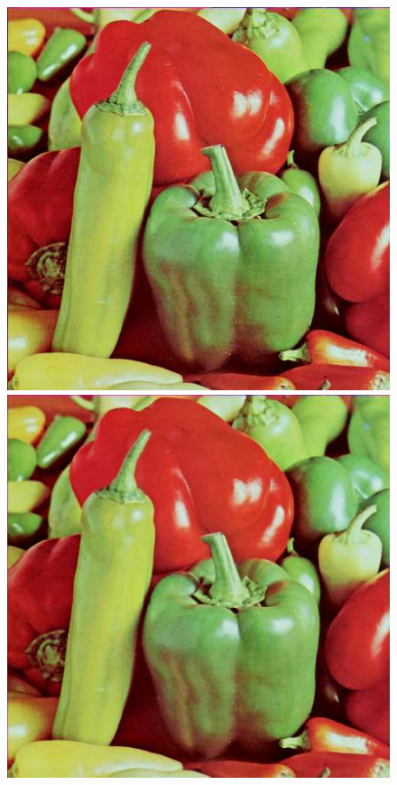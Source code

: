\documentclass{article}
\begin{document}
\begin{figure}[!htb]
\centering
\includegraphics[scale=0.2]{img/peppers_24bit.png}
\includegraphics[scale=0.2]{img/_Filtr_Medianowy_peppers_24bit.png}\\ 

\end{figure}
\end{document}
